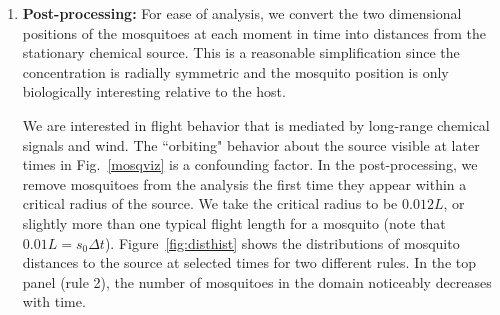 \documentclass[12pt]{article}
\begin{document}
	\begin{enumerate}
		\item \textbf{Post-processing:} For ease of analysis, we convert the two dimensional positions of the mosquitoes at each moment in time into distances from the stationary chemical source. This is a reasonable simplification since the concentration is radially symmetric and the mosquito position is only biologically interesting relative to the host. 
		
		We are interested in flight behavior that is mediated by long-range chemical signals and wind. The ``orbiting" behavior about the source visible at later times in Fig.~\ref{mosqviz} is a confounding factor. In the post-processing, we remove mosquitoes from the analysis the first time they appear within a critical radius of the source. We take the critical radius to be $0.012L$, or slightly more than one typical flight length for a mosquito (note that $0.01L = s_0 \Delta t$). Figure~\ref{fig:disthist} shows the distributions of mosquito distances to the source at selected times for two different rules. In the top panel (rule 2), the number of mosquitoes in the domain noticeably decreases with time.
		

\end{enumerate}
\end{document}

